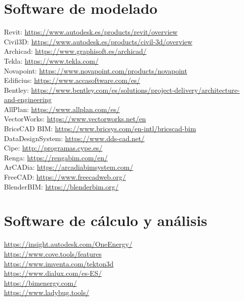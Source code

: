 \documentclass[spanish,12pt,a4paper,final,oneside]{book}
\begin{document}
\section{Software de modelado}
Revit: \url{https://www.autodesk.es/products/revit/overview}
\\Civil3D: \url{https://www.autodesk.es/products/civil-3d/overview}
\\Archicad: \url{https://www.graphisoft.es/archicad/}
\\Tekla: \url{https://www.tekla.com/}
\\Novapoint: \url{https://www.novapoint.com/products/novapoint}
\\Edificius: \url{https://www.accasoftware.com/es/}
\\Bentley: \url{https://www.bentley.com/es/solutions/project-delivery/architecture-and-engineering}
\\AllPlan: \url{https://www.allplan.com/es/}
\\VectorWorks: \url{https://www.vectorworks.net/en}
\\BricsCAD BIM: \url{https://www.bricsys.com/en-intl/bricscad-bim}
\\DataDesignSystem: \url{https://www.dds-cad.net/}
\\Cipe: \url{http://programas.cype.es/}
\\Renga: \url{https://rengabim.com/en/}
\\ArCADia: \url{https://arcadiabimsystem.com/}
\\FreeCAD: \url{https://www.freecadweb.org/}
\\BlenderBIM: \url{https://blenderbim.org/}


\section{Software de cálculo y análisis}
\url{https://insight.autodesk.com/OneEnergy/}
\\ \url{https://www.cove.tools/features}
\\ \url{https://www.imventa.com/tekton3d}
\\ \url{https://www.dialux.com/es-ES/}
\\ \url{https://bimenergy.com/}
\\ \url{https://www.ladybug.tools/}
\end{document}
